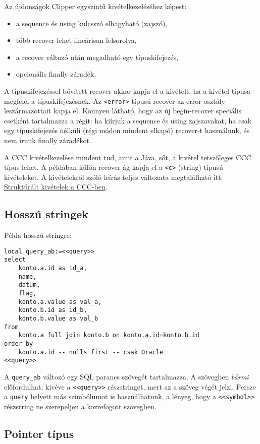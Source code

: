 Az újdonságok Clipper egyszintű kivételkezeléséhez képest:
\begin{itemize}
\item a sequence és using kulcsszó elhagyható (zajszó),
\item több recover lehet lineárisan felsorolva,
\item a recover változó után megadható egy típuskifejezés,
\item opcionális finally záradék.
\end{itemize}

A típuskifejezéssel bővített recover akkor kapja el a kivételt,
ha a kivétel típusa megfelel a típuskifejezésnek. Az \verb!<error>! 
típusú recover az error osztály leszármazottait kapja el.
Könnyen látható, hogy az új begin-recover speciális esetként
tartalmazza a régit: ha kiírjuk a sequence és using zajszavakat,
ha csak egy típuskifejezés nélküli (régi módon mindent elkapó) recover-t 
használunk, és nem írunk finally záradékot.

A CCC kivételkezelése mindent tud, amit a Jáva, sőt, 
a kivétel tetszőleges  CCC típus lehet. A példában
külön recover ág kapja el a \verb!<c>! (string) típusú 
kivételeket. A kivételekről szóló leírás teljes változata
megtalálható itt: \href{exception.html}{Struktúrált kivételek a CCC-ben}.


\subsection{Hosszú stringek}

Példa hosszú stringre:
\begin{verbatim}
local query_ab:=<<query>>
select
    konto.a.id as id_a,
    name,
    datum,
    flag,
    konto.a.value as val_a,
    konto.b.id as id_b,
    konto.b.value as val_b
from
    konto.a full join konto.b on konto.a.id=konto.b.id
order by
    konto.a.id -- nulls first -- csak Oracle
<<query>>
\end{verbatim}
A \verb!query_ab! változó egy SQL parancs szövegét tartalmazza.
A szövegben {\em bármi\/} előfordulhat, kivéve a \verb!<<query>>!
részstringet, mert az a szöveg végét jelzi. Persze a \verb!query! helyett
más szimbólumot is használhatunk, a lényeg, hogy a
\verb!<<symbol>>! részstring ne szerepeljen a közrefogott szövegben.


\subsection{Pointer típus}

